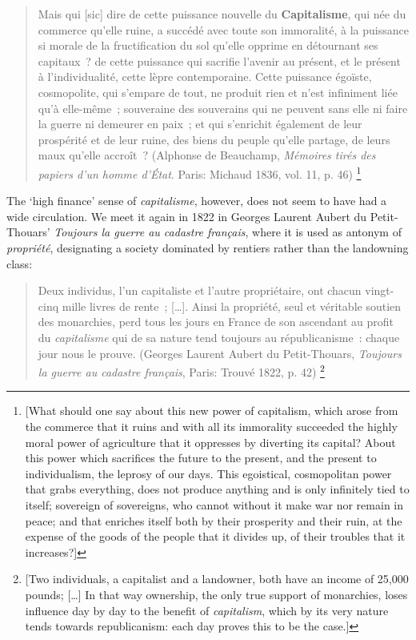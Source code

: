 \documentclass[output=paper]{langsci/langscibook}
\begin{document}
\begin{quote}
Mais qui {[}sic{]} dire de cette puissance nouvelle du
\textbf{Capitalisme}, qui née du commerce qu'elle ruine, a succédé avec
toute son immoralité, à la puissance si morale de la fructification du
sol qu'elle opprime en détournant ses capitaux~? de cette puissance qui
sacrifie l'avenir au présent, et le présent à l'individualité, cette
lèpre contemporaine. Cette puissance égoïste, cosmopolite, qui s'empare
de tout, ne produit rien et n'est infiniment liée qu'à elle-même~;
souveraine des souverains qui ne peuvent sans elle ni faire la guerre ni
demeurer en paix~; et qui s'enrichit également de leur prospérité et de
leur ruine, des biens du peuple qu'elle partage, de leurs maux qu'elle
accroît~?
  (Alphonse de Beauchamp,  \emph{Mémoires tirés des papiers d'un homme
d'État}. Paris: Michaud 1836, vol. 11, p. 46)%
\footnote{{[}What should one say about this new power of
  capitalism, which arose from the commerce that it ruins and with all
  its immorality succeeded the highly moral power of agriculture that it
  oppresses by diverting its capital? About this power which sacrifices
  the future to the present, and the present to individualism, the
  leprosy of our days. This egoistical, cosmopolitan power that grabs
  everything, does not produce anything and is only infinitely tied to
  itself; sovereign of sovereigns, who cannot without it make war nor
  remain in peace; and that enriches itself both by their prosperity and
  their ruin, at the expense of the goods of the people that it divides
  up, of their troubles that it increases?{]}}
\end{quote}

The `high finance' sense of \emph{capitalisme}, however, does not seem
to have had a wide circulation. We meet it again in 1822 in Georges
Laurent Aubert du Petit-Thouars' \emph{Toujours la guerre au cadastre
français}, where it is used as antonym of
\emph{propriété}, designating a society dominated by rentiers rather
than the landowning class:

\begin{quote}
Deux individus, l'un capitaliste et l'autre propriétaire, ont chacun
vingt-cinq mille livres de rente~; {[}\ldots{}{]}. Ainsi la propriété,
seul et véritable soutien des monarchies, perd tous les jours en France
de son ascendant au profit du \emph{capitalisme} qui de sa nature tend
toujours au républicanisme~: chaque jour nous le prouve.
(Georges
Laurent Aubert du Petit-Thouars, \emph{Toujours la guerre au cadastre
français}, Paris: Trouvé 1822, p. 42)%
\footnote{{[}Two
  individuals, a capitalist and a landowner, both have an income of
  25,000 pounds; {[}\ldots{}{]} In that way ownership, the only true
  support of monarchies, loses influence day by day to the benefit of
  \emph{capitalism}, which by its very nature tends towards
  republicanism: each day proves this to be the case.{]}}
\end{quote}
\end{document}
